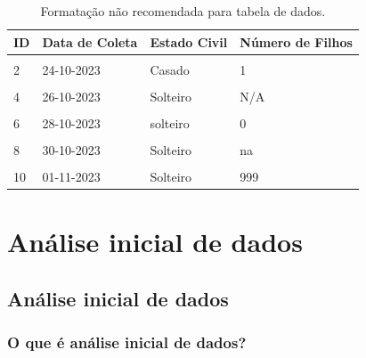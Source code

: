 \documentclass[
  a4paper,
]{book}
\begin{document}
\begin{table}

\caption{\label{tab:tabela-evite}Formatação não recomendada para tabela de dados.}
\centering
\begin{tabu} to 
\toprule
\textbf{ID} & \textbf{Data de Coleta} & \textbf{Estado Civil} & \textbf{Número de Filhos}\\
\midrule
{} &  &  & \\
2 & 24-10-2023 & Casado & 1\\
 &  &  & \\
4 & 26-10-2023 & Solteiro & N/A\\
 &  &  & \\
6 & 28-10-2023 & solteiro & 0\\
 &  &  & \\
8 & 30-10-2023 & Solteiro & na\\
 &  &  & \\
10 & 01-11-2023 & Solteiro & 999\\
\bottomrule
\end{tabu}
\end{table}

\hypertarget{analise-inicial-dados}{%
\chapter{\texorpdfstring{\textbf{Análise inicial de dados}}{Análise inicial de dados}}\label{analise-inicial-dados}}

\hypertarget{analise-inicial}{%
\section{Análise inicial de dados}\label{analise-inicial}}

\hypertarget{o-que-uxe9-anuxe1lise-inicial-de-dados}{%
\subsection{O que é análise inicial de dados?}\label{o-que-uxe9-anuxe1lise-inicial-de-dados}}
\end{document}
